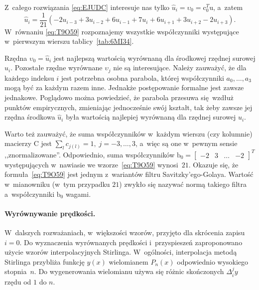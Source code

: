 \documentclass[paper=a4,DIV=12]{tmmlab}
\newcommand{\brm}[1]{\bm{\mathrm{#1}}}
\begin{document}
\begin{appendices}
  Z~całego rozwiązania \eqref{eq:EJUDC} interesuje nas tylko $\hat{u}_i =
  \upsilon_0 = \brm{c}_0^T \brm{u}$, a~zatem
  \begin{equation}
    \hat{u}_i = \frac{1}{21}\left(-2 u_{i-3} + 3 u_{i-2} + 6 u_{i-1} + 7 u_i
                                  +6 u_{i+1} + 3 u_{i+2} - 2 u_{i+3}\right).
    \label{eq:T9O59}
  \end{equation}
  W~równaniu \eqref{eq:T9O59} rozpoznajemy wszystkie współczynniki występujące
  w~pierwszym wierszu tablicy~\ref{tab:6MI34}. 

  Rzędna $\upsilon_0 = \hat{u}_i$ jest najlepszą wartością wyrównaną dla środkowej
  rzędnej surowej $u_i$. Pozostałe rzędne wyrównane $\upsilon_j$ nie są
  interesujące. Należy zauważyć, że dla każdego indeksu $i$ jest potrzebna
  osobna parabola, której współczynniki $a_0,\dots,a_3$ mogą być za każdym
  razem inne. Jednakże postępowanie formalne jest zawsze jednakowe. Poglądowo
  można powiedzieć, że parabola przesuwa się wzdłuż punktów empirycznych,
  zmieniając jednocześnie swój kształt, tak żeby zawsze jej rzędna środkowa
  $\hat{u}_i$ była wartością najlepiej wyrównaną dla rzędnej surowej $u_i$.

  Warto też zauważyć, że suma współczynników w~każdym wierszu (czy kolumnie)
  macierzy $\brm{C}$ jest $\sum_l{c_{j(l)}}=1,\;j=-3,\dots,3$, a~więc są
  one w~pewnym sensie ,,znormalizowane''. Odpowiednio, suma współczynników
  $\brm{b}_0 = \begin{bmatrix} -2 & 3 & \dots & -2 \end{bmatrix}^T$
  występujących w~nawiasie we wzorze~\eqref{eq:T9O59} wynosi~$21$. Okazuje się,
  że formuła~\eqref{eq:T9O59} jest jednym z~wariantów filtru
  Savitzky'ego-Golaya. Wartość w~mianowniku (w~tym przypadku $21$) zwykło się
  nazywać normą takiego filtra a~współczynniki $\brm{b}_{0}$ wagami.

  \paragraph{Wyrównywanie prędkości.} W~dalszych rozważaniach, w~większości
  wzorów, przyjęto dla skrócenia zapisu $i=0$. Do wyznaczenia wyrównanych
  prędkości i~przyspieszeń zaproponowano~\cite{oderfeld:1958:opewnym} użycie
  wzorów interpolacyjnych Stirlinga. W~ogólności, interpolacja metodą Stirlinga
  przybliża funkcję $y(x)$ wielomianem $P_n(x)$ odpowiednio wysokiego
  stopnia~$n$. Do wygenerowania wielomianu używa się różnic skończonych
  $\Delta_i^jy$ rzędu od $1$ do $n$.


\end{appendices}
\end{document}
